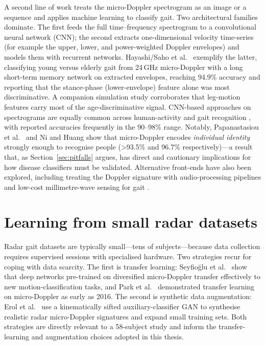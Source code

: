 A second line of work treats the micro-Doppler spectrogram as an image or a
sequence and applies machine learning to classify gait. Two architectural
families dominate. The first feeds the full time--frequency spectrogram to a
convolutional neural network (CNN); the second extracts one-dimensional velocity
time-series (for example the upper, lower, and power-weighted Doppler envelopes)
and models them with recurrent networks. Hayashi/Saho et al.\
\cite{hayashi2021} exemplify the latter, classifying young versus elderly gait
from 24\,GHz micro-Doppler with a long short-term memory network on extracted
envelopes, reaching 94.9\% accuracy and reporting that the stance-phase
(lower-envelope) feature alone was most discriminative. A companion simulation
study \cite{hoshiga2021} corroborates that leg-motion features carry most of the
age-discriminative signal. CNN-based approaches on spectrograms are equally
common across human-activity and gait recognition
\cite{papanastasiou2020,ni2020,fard2026,nguyen2024,ha2023}, with reported
accuracies frequently in the 90--98\% range. Notably, Papanastasiou et al.\
\cite{papanastasiou2020} and Ni and Huang \cite{ni2020} show that micro-Doppler
encodes \emph{individual identity} strongly enough to recognise people
(>93.5\% and 96.7\% respectively)---a result that, as Section~\ref{sec:pitfalls}
argues, has direct and cautionary implications for how disease classifiers must
be validated. Alternative front-ends have also been explored, including treating
the Doppler signature with audio-processing pipelines \cite{ha2023} and
low-cost millimetre-wave sensing for gait \cite{alanazi2022}.

\section{Learning from small radar datasets}
\label{sec:small}

Radar gait datasets are typically small---tens of subjects---because data
collection requires supervised sessions with specialised hardware. Two
strategies recur for coping with data scarcity. The first is transfer learning:
Seyfio\u{g}lu et al.\ \cite{seyfioglu2018} show that deep networks pre-trained on
diversified micro-Doppler transfer effectively to new motion-classification
tasks, and Park et al.\ \cite{park2016} demonstrated transfer learning on
micro-Doppler as early as 2016. The second is synthetic data augmentation:
Erol et al.\ \cite{erol2020} use a kinematically sifted auxiliary-classifier
GAN to synthesise realistic radar micro-Doppler signatures and expand small
training sets. Both strategies are directly relevant to a 58-subject study and
inform the transfer-learning and augmentation choices adopted in this thesis.

